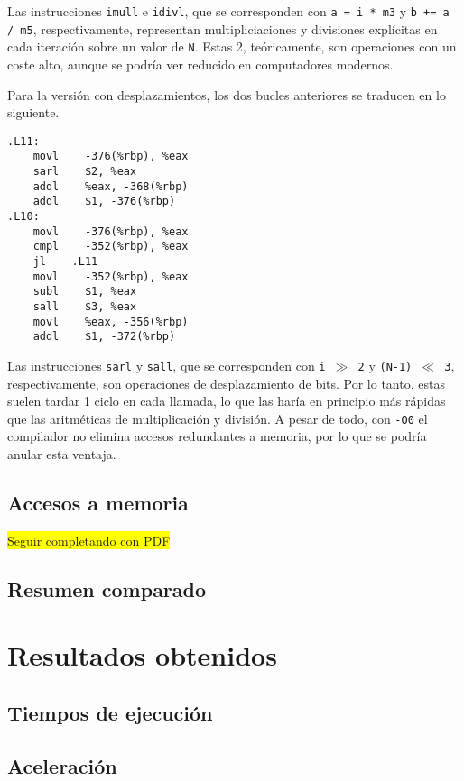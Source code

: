 \documentclass[11pt,a4paper,twoside]{article}
\theoremstyle{definition}
\begin{document}
	Las instrucciones \texttt{imull} e \texttt{idivl}, que se corresponden con \texttt{a = i * m3} y \texttt{b += a / m5}, respectivamente, representan multipliciaciones y divisiones explícitas en cada iteración sobre un valor de \texttt{N}. Estas 2, teóricamente, son operaciones con un coste alto, aunque se podría ver reducido en computadores modernos.
	
	Para la versión con desplazamientos, los dos bucles anteriores se traducen en lo siguiente.
	
	\begin{verbatim}
.L11:
	movl	-376(%rbp), %eax
	sarl	$2, %eax
	addl	%eax, -368(%rbp)
	addl	$1, -376(%rbp)
.L10:
	movl	-376(%rbp), %eax
	cmpl	-352(%rbp), %eax
	jl	  .L11
	movl	-352(%rbp), %eax
	subl	$1, %eax
	sall	$3, %eax
	movl	%eax, -356(%rbp)
	addl	$1, -372(%rbp)
	\end{verbatim}

	Las instrucciones \texttt{sarl} y \texttt{sall}, que se corresponden con \texttt{i $\gg$ 2} y \texttt{(N-1) $\ll$ 3}, respectivamente, son operaciones de desplazamiento de bits. Por lo tanto, estas suelen tardar 1 ciclo en cada llamada, lo que las haría en principio más rápidas que las aritméticas de multiplicación y división. A pesar de todo, con \texttt{-O0} el compilador no elimina accesos redundantes a memoria, por lo que se podría anular esta ventaja.
	
	\subsection{Accesos a memoria}
	
	\colorbox{yellow}{Seguir completando con PDF}
	
	\subsection{Resumen comparado}
	
	\section{Resultados obtenidos}
	
	\subsection{Tiempos de ejecución}
	
	\subsection{Aceleración}
	
\end{document}
